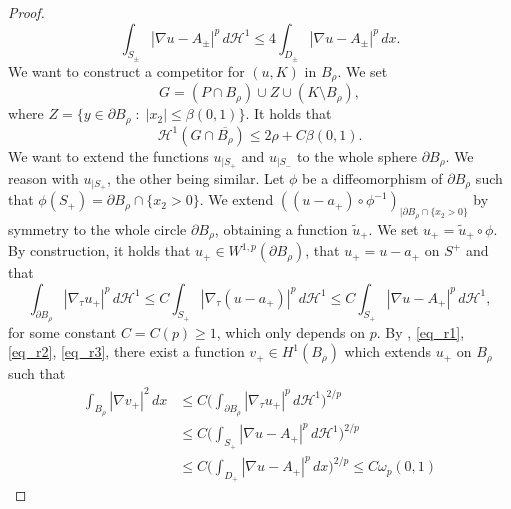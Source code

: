 \documentclass[12pt]{article}
\theoremstyle{definition}
\theoremstyle{remark}
\numberwithin{equation}{section}
\newcommand{\dd}{\partial}
\newcommand{\abs}[1]{\lvert #1 \rvert}
\newcommand{\D}{\nabla}
\renewcommand{\H}{\mathcal{H}}
\begin{document}
\begin{proof}
    \begin{equation}\label{eq_r2}
        \int_{S_\pm}|\D u-A_\pm|^p\,d\H^1\leq 4 \int_{D_\pm}|\D u-A_{\pm}|^p\,dx.
    \end{equation}
    We want to construct a competitor for $(u,K)$ in $B_\rho$. We set
    \begin{equation}
        G=(P \cap B_\rho) \cup Z \cup (K\setminus B_\rho), %
    \end{equation}
    where $Z=\{y\in\dd B_\rho \;:\; \abs{x_2} \leq \beta(0,1)\}$. It holds that
    \begin{equation}\label{eqq2}
        \mathcal{H}^1(G \cap \overline{B_\rho})\leq 2\rho + C\beta(0,{1}).
    \end{equation}
    We want to extend the functions $u_{|S_+}$ and $u_{|S_-}$ to the whole sphere $\dd B_\rho$. We reason with
    $u_{|S_+}$, the other being similar. Let $\phi$ be a diffeomorphism of $\dd B_\rho$ such that $\phi(S_+)=\dd
    B_\rho\cap\{x_2>0\}$. We extend $((u-a_+)\circ\phi^{-1})_{|\dd B_\rho\cap\{x_2>0\}}$ by symmetry to the whole circle $\dd B_\rho$, obtaining a function $\tilde{u}_+$. We set $u_+=\tilde{u}_+\circ\phi$. By construction,
    it holds that $u_+\in W^{1,p}(\dd B_\rho)$, that $u_+ = u - a_+$ on $S^+$ and that
    \begin{equation}\label{eq_r3}
        \int_{\dd B_\rho}|\D_\tau u_+|^p\,d\H^1\leq C\int_{S_+}|\D_\tau(u-a_+)|^p\,d\H^1\leq C\int_{S_+}|\D u-A_+|^p\,d\H^1,
    \end{equation}
    for some constant $C=C(p) \geq 1$, which only depends on $p$.
    By \cite[Lemma 22.32]{d}, \eqref{eq_r1}, \eqref{eq_r2}, \eqref{eq_r3}, there exist a function $v_+\in
    H^1(B_\rho)$ which extends $u_+$ on $B_\rho$ such that
    \begin{equation}\label{eqq3}
        \begin{aligned}
            \int_{B_\rho}|\D v_+|^2\,dx
             & \leq C \biggl(\int_{\dd B_\rho}|\D_\tau u_+|^p\,d\H^1\biggr)^{2/p}\\
             & \leq C \biggl(\int_{S_+}|\D u-A_+|^p\,d\H^1\biggr)^{2/p}\\
             & \leq C \biggl(\int_{D_+}|\D u-A_+|^p\,dx\biggr)^{2/p} \leq C \omega_p(0,1)
        \end{aligned}

\end{equation}
\end{proof}
\end{document}
